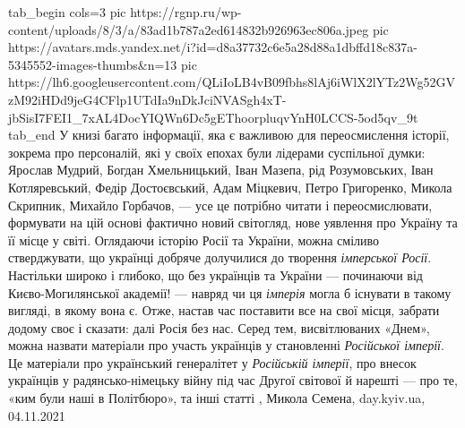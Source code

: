 \ifcmt
  tab_begin cols=3
     pic https://rgnp.ru/wp-content/uploads/8/3/a/83ad1b787a2ed614832b926963ec806a.jpeg
     pic https://avatars.mds.yandex.net/i?id=d8a37732c6e5a28d88a1dbffd18c837a-5345552-images-thumbs&n=13
		 pic https://lh6.googleusercontent.com/QLiIoLB4vB09fbhs8lAj6iWlX2lYTz2Wg52GVzM92iHDd9jeG4CFlp1UTdIa9nDkJciNVASgh4xT-jbSisI7FEI1_7xAL4DocYIQWn6Dc5gEThoorpluqvYnH0LCCS-5od5qv_9t
  tab_end
\fi
У книзі багато інформації, яка є важливою для переосмислення історії, зокрема
про персоналій, які у своїх епохах були лідерами суспільної думки: Ярослав
Мудрий, Богдан Хмельницький, Іван Мазепа, рід Розумовських, Іван Котляревський,
Федір Достоєвський, Адам Міцкевич, Петро Григоренко, Микола Скрипник, Михайло
Горбачов, — усе це потрібно читати і переосмислювати, формувати на цій основі
фактично новий світогляд, нове уявлення про Україну та її місце у світі.
Оглядаючи історію Росії та України, можна сміливо стверджувати, що українці
добряче долучилися до творення \emph{імперської Росії}. Настільки широко і глибоко, що
без українців та України — починаючи від Києво-Могилянської академії! — навряд
чи ця \emph{імперія} могла б існувати в такому вигляді, в якому вона є. Отже, настав
час поставити все на свої місця, забрати додому своє і сказати: далі Росія без
нас. Серед тем, висвітлюваних «Днем», можна назвати матеріали про участь
українців у становленні \emph{Російської імперії}. Це матеріали про український
генералітет у \emph{Російській імперії}, про внесок українців у радянсько-німецьку
війну під час Другої світової й нарешті — про те, «ким були наші в Політбюро»,
та інші статті
, 
Микола Семена, day.kyiv.ua, 04.11.2021
